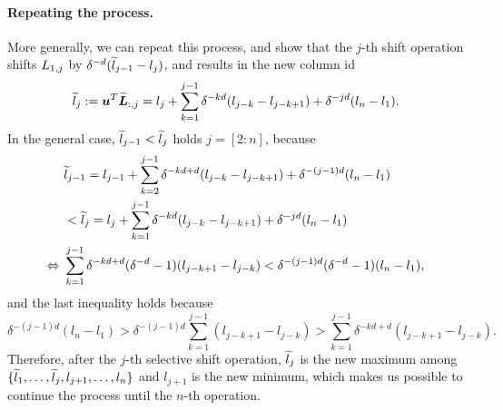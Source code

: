\paragraph{Repeating the process.}
More generally, we can repeat this process, and show that the $j$-th shift operation shifts ${L}_{1,j}$ by $\delta^{-d} (\widetilde{l}_{j-1} - l_j)$, and results in the new column id
\begin{equation*}
    \widetilde{l}_j := 
    {\bm{u}}^T \widetilde{{\bm{L}}}_{:,j}
    =
    l_j + \sum_{k=1}^{j-1} \delta^{-kd}(l_{j-k}-l_{j-k+1}) + \delta^{-jd} (l_n-l_1).
\end{equation*}
In the general case, $\widetilde{l}_{j-1} < \widetilde{l}_j$ holds $j = [2:n]$, because
\begin{align*}
     &\widetilde{l}_{j-1} = l_{j-1} + \sum_{k=2}^{j-1} \delta^{-kd+d}(l_{j-k}-l_{j-k+1}) + \delta^{-(j-1)d} (l_n-l_1)\\
     &< \widetilde{l}_j = l_j + \sum_{k=1}^{j-1} \delta^{-kd}(l_{j-k}-l_{j-k+1}) + \delta^{-jd} (l_n-l_1)\\
     \Leftrightarrow~&
     \sum_{k=1}^{j-1} \delta^{-kd+d} (\delta^{-d}-1)(l_{j-k+1}-l_{j-k}) <
     \delta^{-(j-1)d}(\delta^{-d}-1)(l_n-l_1),
\end{align*}
and the last inequality holds because
\begin{equation*}
    \delta^{-(j-1)d}(l_n-l_1) > \delta^{-(j-1)d} \sum_{k=1}^{j-1}(l_{j-k+1} - l_{j-k}) > \sum_{k=1}^{j-1} \delta^{-kd+d} (l_{j-k+1}-l_{j-k}).
\end{equation*}
Therefore, after the $j$-th selective shift operation, $\widetilde{l}_j$ is the new maximum among $\{\widetilde{l}_1, \dots, \widetilde{l}_j, l_{j+1}, \dots, l_n\}$ and $l_{j+1}$ is the new minimum, which makes us possible to continue the process until the $n$-th operation.


